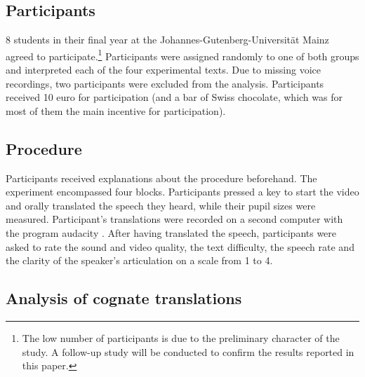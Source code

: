\documentclass[output=paper]{LSP/langsci}
\begin{document}
\subsection{Participants}

8  students in their final year at the Johannes-Gutenberg-Universität Mainz agreed to participate.\footnote{The low number of participants is due to the preliminary character of the study. A follow-up study will be conducted to confirm the results reported in this paper.} Participants were assigned randomly to one of both groups and interpreted each of the four experimental texts. Due to missing voice recordings, two participants were excluded from the analysis. Participants received 10 euro for participation (and a bar of Swiss chocolate, which was for most of them the main incentive for participation). 

\subsection{Procedure}

Participants received explanations about the procedure beforehand. The experiment encompassed four blocks. Participants pressed a key to start the video and orally translated the speech they heard, while their pupil sizes were measured. Participant's translations were recorded on a second computer with the program audacity \citep{Audacity2015}. After having translated the speech, participants were asked to rate the sound and video quality, the text difficulty, the speech rate and the clarity of the speaker's articulation on a scale from 1 to 4.

\subsection{Analysis of cognate translations}
\end{document}
